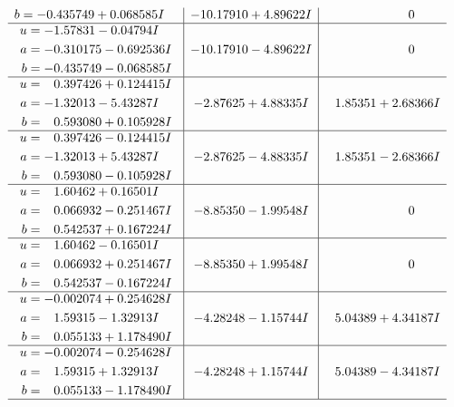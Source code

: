 \documentclass[1p]{elsarticle_modified}
\theoremstyle{definition}
\begin{document}
$$\begin{array}{c|c|c}
\begin{aligned}
b &= -0.435749 + 0.068585 I\end{aligned}
 & -10.17910 + 4.89622 I & \phantom{-0.000000 } 0 \\ \hline\begin{aligned}
u &= -1.57831 - 0.04794 I \\
a &= -0.310175 - 0.692536 I \\
b &= -0.435749 - 0.068585 I\end{aligned}
 & -10.17910 - 4.89622 I & \phantom{-0.000000 } 0 \\ \hline\begin{aligned}
u &= \phantom{-}0.397426 + 0.124415 I \\
a &= -1.32013 - 5.43287 I \\
b &= \phantom{-}0.593080 + 0.105928 I\end{aligned}
 & -2.87625 + 4.88335 I & \phantom{-}1.85351 + 2.68366 I \\ \hline\begin{aligned}
u &= \phantom{-}0.397426 - 0.124415 I \\
a &= -1.32013 + 5.43287 I \\
b &= \phantom{-}0.593080 - 0.105928 I\end{aligned}
 & -2.87625 - 4.88335 I & \phantom{-}1.85351 - 2.68366 I \\ \hline\begin{aligned}
u &= \phantom{-}1.60462 + 0.16501 I \\
a &= \phantom{-}0.066932 - 0.251467 I \\
b &= \phantom{-}0.542537 + 0.167224 I\end{aligned}
 & -8.85350 - 1.99548 I & \phantom{-0.000000 } 0 \\ \hline\begin{aligned}
u &= \phantom{-}1.60462 - 0.16501 I \\
a &= \phantom{-}0.066932 + 0.251467 I \\
b &= \phantom{-}0.542537 - 0.167224 I\end{aligned}
 & -8.85350 + 1.99548 I & \phantom{-0.000000 } 0 \\ \hline\begin{aligned}
u &= -0.002074 + 0.254628 I \\
a &= \phantom{-}1.59315 - 1.32913 I \\
b &= \phantom{-}0.055133 + 1.178490 I\end{aligned}
 & -4.28248 - 1.15744 I & \phantom{-}5.04389 + 4.34187 I \\ \hline\begin{aligned}
u &= -0.002074 - 0.254628 I \\
a &= \phantom{-}1.59315 + 1.32913 I \\
b &= \phantom{-}0.055133 - 1.178490 I\end{aligned}
 & -4.28248 + 1.15744 I & \phantom{-}5.04389 - 4.34187 I\\
 \hline 
 \end{array}$$\newpage
\end{document}
